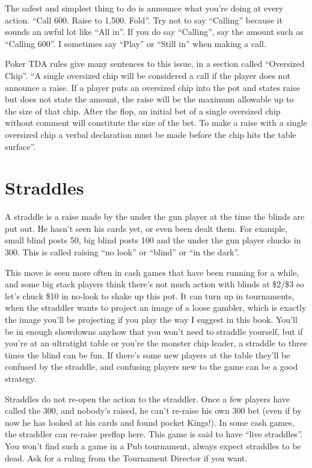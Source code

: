 The safest and simplest thing to do is announce what you're doing
at every action. ``Call 600. Raise to 1,500. Fold''. Try not to
say ``Calling'' because it sounds an awful lot like ``All in''.
If you do say ``Calling'', say the amount such as ``Calling 600''.
I sometimes say ``Play'' or ``Still in'' when making a call.

Poker TDA rules give many sentences to this issue, in a section
called ``Oversized Chip''. ``A single oversized chip will be considered
a call if the player does not announce a raise. If a player puts an
oversized chip into the pot and states raise but does not state the
amount, the raise will be the maximum allowable up to the size of that
chip. After the flop, an initial bet of a single oversized chip
without comment will constitute the size of the bet. To make a raise
with a single oversized chip a verbal declaration must be made
before the chip hits the table surface''.

\section{Straddles}

A straddle is a raise made by the under the gun player at
the time the blinds are put out. He hasn't seen his cards yet,
or even been dealt them. For example, small blind posts
50, big blind posts 100 and the under the gun player chucks in 300.
This is called raising ``no look'' or ``blind'' or ``in the dark''.

This move is seen more often in cash games that have been running
for a while, and some big stack players think there's not much
action with blinds at \$2/\$3 so let's chuck \$10
in no-look to shake up this pot. It can turn up in tournaments,
when the straddler wants to project an image of a loose gambler,
which is exactly the image you'll be projecting if you play
the way I suggest in this book. You'll be in enough showdowns anyhow
that you won't need to straddle yourself, but if you're at an ultratight
table or you're the monster chip leader, a straddle to three times
the blind can be fun. If there's some new players at the table they'll
be confused by the straddle, and confusing players new to the game
can be a good strategy.

Straddles do not re-open the action to the straddler. Once a few
players have called the 300, and nobody's raised, he can't re-raise
his own 300 bet (even if by now he has looked at his cards
and found pocket Kings!). In some cash games, the straddler can re-raise
preflop here. This game is said to have ``live straddles''. You won't
find such a game in a Pub tournament, always expect straddles to be dead.
Ask for a ruling from the Tournament Director if you want.

